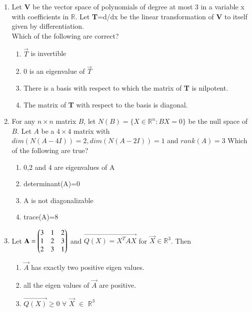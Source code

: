 \renewcommand{\theequation}{\theenumi}
\renewcommand{\thefigure}{\theenumi}
\begin{enumerate}[label=\thesection.\arabic*.,ref=\thesection.\theenumi]

\item Let \textbf{V} be the vector space of polynomials of degree at most 3 in a variable x with coefficients in $\mathbb{R}$. Let \textbf{T}=d/dx be the linear transformation of \textbf{V} to itself given by differentiation.\\

Which of the following are correct?\\
\begin{enumerate}
\item $\vec{T}$ is invertible
\item 0 is an eigenvalue of $\vec{T}$
\item There is a basis with respect to which the matrix of \textbf{T} is nilpotent.
\item The matrix of \textbf{T} with respect to the basis  is diagonal.
\end{enumerate}
\solution

\item For any $n\times n$ matrix $B$, let $N(B)=\{X\in \mathbb{R}^n:BX=0\}$ be the null space of $B$. Let $A$ be a $4\times 4$ matrix with $dim(N(A-4I))=2, dim(N(A-2I))=1$ and $rank(A)=3$
Which of the following are true?
\begin{enumerate}
\item 0,2 and 4 are eigenvalues of A
\item determinant(A)=0
\item A is not diagonalizable
\item trace(A)=8
\end{enumerate}
%
\solution
%
\item Let $\mathbf{A} = \begin{pmatrix}3 & 1 & 2 \\ 1 & 2 & 3 \\ 2 & 3 & 1  \end{pmatrix}$ and $\vec{Q(X) = X^TAX}$ for $\vec{X} \in \mathbb{R}^{3}$. Then
\begin{enumerate}
	\item $\vec{A}$ has exactly two positive eigen values.
	\item all the eigen values of $\vec{A}$ are positive.
	\item $\vec{Q(X)} \geq 0 $ $\forall$ $\vec{X}$ $\in$ $\mathbb{R}^3$

\end{enumerate}
\end{enumerate}
